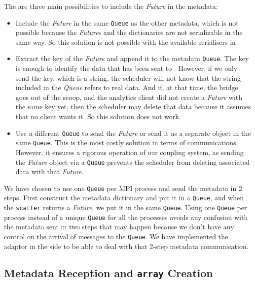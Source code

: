 The are three main possibilities to include the \textit{Future} in the metadata: 
\begin{itemize}
    \item Include the \textit{Future} in the same \texttt{Queue} as the other metadata, which is not possible because the \textit{Future}s and the dictionaries are not serializable in the same way. So this solution is not possible with the available serialisers in \dask. 
    
    \item Extract the key of the \textit{Future} and append it to the metadata \texttt{Queue}. The key is enough to identify the data that has been sent to \dask. However, if we only send the key, which is a string, the scheduler will not know that the string included in the \textit{Queue} refers to real data. And if, at that time, the bridge goes out of the scoop, and the analytics client did not create a \textit{Future} with the same key yet, then the scheduler may delete that data because it assumes that no client wants it. So this solution does not work.
    
    \item Use a different \texttt{Queue} to send the \textit{Future} or send it as a separate object in the same \texttt{Queue}. This is the most costly solution in terms of communications. However, it ensures a rigorous operation of our coupling system, as sending the \textit{Future} object via a \texttt{Queue} prevents the scheduler from deleting associated data with that \textit{Future}. 
\end{itemize}

We have chosen to use one \texttt{Queue} per MPI process and send the metadata in 2 steps. First construct the metadata dictionary and put it in a \texttt{Queue}, and when the \texttt{scatter} returns a \textit{Future}, we put it in the same \texttt{Queue}. 
Using one \texttt{Queue} per process instead of a unique \texttt{Queue} for all the processes avoids any confusion with  the metadata sent in two steps that may happen because we don't have any control on the arrival of messages to the \texttt{Queue}. 
We have implemented the \deisa adaptor in the \dask side to be able to deal with that 2-step metadata communication.


\subsection{Metadata Reception and \dask \texttt{array} Creation} 

